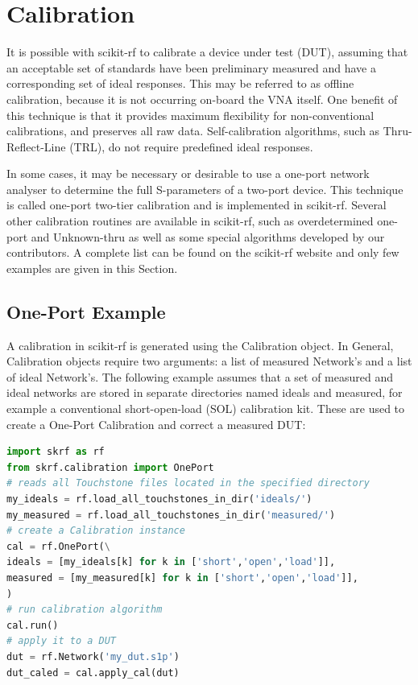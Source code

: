 \documentclass{IEEEjmw}
\begin{document}
\section{Calibration}
It is possible with scikit-rf to calibrate a device under test (DUT), assuming that an acceptable set of standards have been preliminary measured and have a corresponding set of ideal responses. This may be referred to as offline calibration, because it is not occurring on-board the VNA itself. One benefit of this technique is that it provides maximum flexibility for non-conventional calibrations, and preserves all raw data. Self-calibration algorithms, such as Thru-Reflect-Line (TRL), do not require predefined ideal responses.

In some cases, it may be necessary or desirable to use a one-port network analyser to determine the full S-parameters of a two-port device. This technique is called one-port two-tier calibration and is implemented in scikit-rf. Several other calibration routines are available in scikit-rf, such as overdetermined one-port and Unknown-thru as well as some special algorithms developed by our contributors. A complete list can be found on the scikit-rf website and only few examples are given in this Section.

\subsection{One-Port Example}
A calibration in scikit-rf is generated using the Calibration object. In General, Calibration objects require two arguments: a list of measured Network’s and a list of ideal Network’s. The following example assumes that a set of measured and ideal networks are stored in separate directories named ideals and measured, for example a conventional short-open-load (SOL) calibration kit. These are used to create a One-Port Calibration and correct a measured DUT:

\begin{lstlisting}[language=Python]
import skrf as rf
from skrf.calibration import OnePort
# reads all Touchstone files located in the specified directory
my_ideals = rf.load_all_touchstones_in_dir('ideals/')
my_measured = rf.load_all_touchstones_in_dir('measured/')
# create a Calibration instance
cal = rf.OnePort(\
ideals = [my_ideals[k] for k in ['short','open','load']],
measured = [my_measured[k] for k in ['short','open','load']],
)
# run calibration algorithm
cal.run()
# apply it to a DUT
dut = rf.Network('my_dut.s1p')
dut_caled = cal.apply_cal(dut)
\end{lstlisting}
\end{document}
